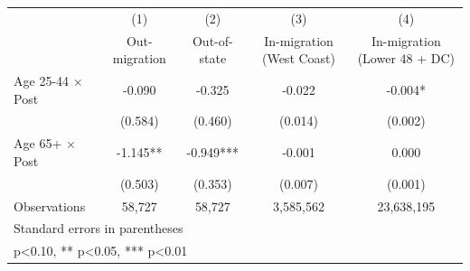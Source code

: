 {
\def\sym#1{\ifmmode^{#1}\else\(^{#1}\)\fi}
\begin{tabular}{l*{4}{c}}
\hline\hline
            &\multicolumn{1}{c}{(1)}&\multicolumn{1}{c}{(2)}&\multicolumn{1}{c}{(3)}&\multicolumn{1}{c}{(4)}\\
            &\multicolumn{1}{c}{Out-migration}&\multicolumn{1}{c}{Out-of-state}&\multicolumn{1}{c}{In-migration (West Coast)}&\multicolumn{1}{c}{In-migration (Lower 48 + DC)}\\
\hline
Age 25-44 $\times$ Post&      -0.090   &      -0.325   &      -0.022   &      -0.004*  \\
            &     (0.584)   &     (0.460)   &     (0.014)   &     (0.002)   \\
[1em]
Age 65+ $\times$ Post&      -1.145** &      -0.949***&      -0.001   &       0.000   \\
            &     (0.503)   &     (0.353)   &     (0.007)   &     (0.001)   \\
\hline
Observations&      58,727   &      58,727   &   3,585,562   &  23,638,195   \\
\hline\hline
\multicolumn{5}{l}{\footnotesize Standard errors in parentheses}\\
\multicolumn{5}{l}{\footnotesize * p<0.10, ** p<0.05, *** p<0.01}\\
\end{tabular}
}
